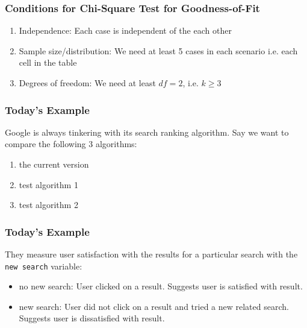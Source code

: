 \documentclass[handout]{beamer}
\newcommand{\blue}[1]{\textcolor{blue2}{#1}}
\begin{document}
\begin{frame}[fragile]
\frametitle{Conditions for Chi-Square Test for Goodness-of-Fit}
\begin{enumerate}
\item \blue{Independence}:  Each case is independent of the each other
\item \blue{Sample size/distribution}:  We need at least 5 cases in each scenario i.e. each cell in the table
\item \blue{Degrees of freedom}:  We need at least $df=2$, i.e. $k\geq 3$
\end{enumerate}

\end{frame}


\begin{frame}
\frametitle{Today's Example}
Google is always tinkering with its search ranking \blue{algorithm}.  Say we want to compare the following 3 algorithms:
\begin{enumerate}
\item the current version
\item test algorithm 1
\item test algorithm 2
\end{enumerate}

\end{frame}


\begin{frame}
\frametitle{Today's Example}

They measure user satisfaction with the results for a particular search with the \blue{{\tt new search}} variable:
\begin{itemize}
\pause\item no new search: User clicked on a result. Suggests user is satisfied with result.
\pause\item new search: User \blue{did not} click on a result and tried a new related search.  Suggests user is dissatisfied with result.
\end{itemize}


\end{frame}
\end{document}
